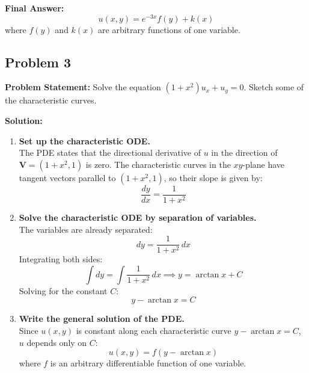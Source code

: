 \documentclass[11pt]{article}
\begin{document}
\noindent\textbf{Final Answer:}
\[
\boxed{u(x, y) = e^{-3x}f(y) + k(x)}
\]
where $f(y)$ and $k(x)$ are arbitrary functions of one variable.

\hrulefill

\subsection*{Problem 3}
\textbf{Problem Statement:} Solve the equation $(1 + x^2)u_x + u_y = 0$. Sketch some of the characteristic curves.

\textbf{Solution:}
\begin{enumerate}[label=\textbf{Step \arabic*:}]
    \item \textbf{Set up the characteristic ODE.} \\
    The PDE states that the directional derivative of $u$ in the direction of $\mathbf{V} = (1 + x^2, 1)$ is zero. The characteristic curves in the $xy$-plane have tangent vectors parallel to $(1 + x^2, 1)$, so their slope is given by:
    \[
    \frac{dy}{dx} = \frac{1}{1 + x^2}
    \]

    \item \textbf{Solve the characteristic ODE by separation of variables.} \\
    The variables are already separated:
    \[
    dy = \frac{1}{1 + x^2}\,dx
    \]
    Integrating both sides:
    \[
    \int dy = \int \frac{1}{1 + x^2}\,dx \implies y = \arctan x + C
    \]
    Solving for the constant $C$:
    \[
    y - \arctan x = C
    \]

    \item \textbf{Write the general solution of the PDE.} \\
    Since $u(x, y)$ is constant along each characteristic curve $y - \arctan x = C$, $u$ depends only on $C$:
    \[
    u(x, y) = f(y - \arctan x)
    \]
    where $f$ is an arbitrary differentiable function of one variable.


\end{enumerate}
\end{document}
